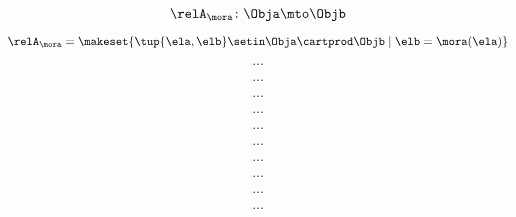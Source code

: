{\begin{forslides}
    \begin{equation}
        \label{eq:slides_trace_monoidal_38}
        \relA_\mora \colon \Obja \mto \Objb
    \end{equation}

    \begin{equation}
        \label{eq:slides_trace_monoidal_39}
        \relA_\mora = \makeset{ \tup{\ela, \elb} \setin \Obja \cartprod \Objb \mid \elb = \mora(\ela)}
    \end{equation}

    \begin{equation}
        \label{eq:slides_trace_monoidal_40}
        ...
    \end{equation}

    \begin{equation}
        \label{eq:slides_trace_monoidal_41}
        ...
    \end{equation}

    \begin{equation}
        \label{eq:slides_trace_monoidal_42}
        ...
    \end{equation}

    \begin{equation}
        \label{eq:slides_trace_monoidal_43}
        ...
    \end{equation}

    \begin{equation}
        \label{eq:slides_trace_monoidal_44}
        ...
    \end{equation}

    \begin{equation}
        \label{eq:slides_trace_monoidal_45}
        ...
    \end{equation}

    \begin{equation}
        \label{eq:slides_trace_monoidal_46}
        ...
    \end{equation}

    \begin{equation}
        \label{eq:slides_trace_monoidal_47}
        ...
    \end{equation}

    \begin{equation}
        \label{eq:slides_trace_monoidal_48}
        ...
    \end{equation}

    \begin{equation}
        \label{eq:slides_trace_monoidal_49}
        ...
    \end{equation}


\end{forslides}}
